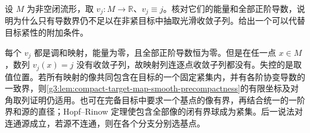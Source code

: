 \begin{exercise}\label{g3:ex:noncompact-target-escape}
	设 \(M\) 为非空闭流形，取 \(v_j:M\to\mathbb R\)、\(v_j\equiv j\)。核对它们的能量和全部正阶导数，说明为什么只有导数界仍不足以在非紧目标中抽取光滑收敛子列。给出一个可以代替目标紧性的附加条件。
\end{exercise}
\begin{solution}
	每个 \(v_j\) 都是调和映射，能量为零，且全部正阶导数恒为零。但是在任一点 \(x\in M\)，数列 \(v_j(x)=j\) 没有收敛子列，故映射列连逐点收敛子列都没有。失控的是取值位置。若所有映射的像共同包含在目标的一个固定紧集内，并有各阶协变导数的一致界，则\cref{g3:lem:compact-target-map-smooth-precompactness}的有限坐标及对角取列证明仍适用。也可在完备目标中要求一个基点的像有界，再结合统一的一阶界和源的直径；Hopf--Rinow 定理使包含全部像的闭有界球成为紧集。后一说法对连通源成立，若源不连通，则在各个分支分别选基点。
\end{solution}
